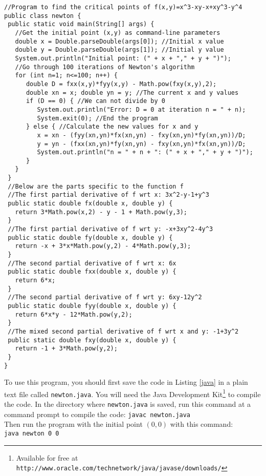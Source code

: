 \begin{exmp}
\begin{lstlisting}
//Program to find the critical points of f(x,y)=x^3-xy-x+xy^3-y^4
public class newton {
 public static void main(String[] args) {
   //Get the initial point (x,y) as command-line parameters
   double x = Double.parseDouble(args[0]); //Initial x value
   double y = Double.parseDouble(args[1]); //Initial y value
   System.out.println("Initial point: (" + x + "," + y + ")");
   //Go through 100 iterations of Newton's algorithm
   for (int n=1; n<=100; n++) {
      double D = fxx(x,y)*fyy(x,y) - Math.pow(fxy(x,y),2);
      double xn = x; double yn = y; //The current x and y values
      if (D == 0) { //We can not divide by 0
         System.out.println("Error: D = 0 at iteration n = " + n);
         System.exit(0); //End the program
      } else { //Calculate the new values for x and y
         x = xn - (fyy(xn,yn)*fx(xn,yn) - fxy(xn,yn)*fy(xn,yn))/D;
         y = yn - (fxx(xn,yn)*fy(xn,yn) - fxy(xn,yn)*fx(xn,yn))/D;
         System.out.println("n = " + n + ": (" + x + "," + y + ")");
      }
   }
 }
 //Below are the parts specific to the function f
 //The first partial derivative of f wrt x: 3x^2-y-1+y^3
 public static double fx(double x, double y) {
   return 3*Math.pow(x,2) - y - 1 + Math.pow(y,3);
 }
 //The first partial derivative of f wrt y: -x+3xy^2-4y^3
 public static double fy(double x, double y) {
   return -x + 3*x*Math.pow(y,2) - 4*Math.pow(y,3);
 }
 //The second partial derivative of f wrt x: 6x
 public static double fxx(double x, double y) {
   return 6*x;
 }
 //The second partial derivative of f wrt y: 6xy-12y^2
 public static double fyy(double x, double y) {
   return 6*x*y - 12*Math.pow(y,2);
 }
 //The mixed second partial derivative of f wrt x and y: -1+3y^2
 public static double fxy(double x, double y) {
   return -1 + 3*Math.pow(y,2);
 }
}
\end{lstlisting}

To use this program, you should first save the code in Listing \ref{java} in a plain text file called
\texttt{newton.java}. You will need the Java Development Kit\footnote{Available for free at
\texttt{http://www.oracle.com/technetwork/java/javase/downloads/}} to compile the code. In the directory where \texttt{newton.java} is
saved, run this command at a command prompt to compile the code: \texttt{javac newton.java}\\
Then run the program with the initial point $(0,0)$ with this command:\\\texttt{java newton 0 0}


\end{exmp}

